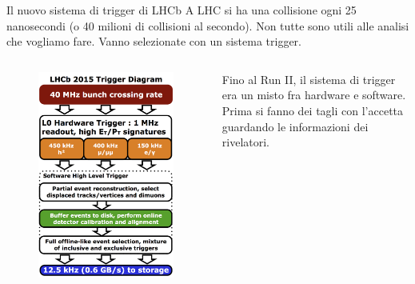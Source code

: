 \documentclass[
10pt,
aspectratio=169,
]{beamer}
\begin{document}
\begin{frame}{Il nuovo sistema di trigger di LHCb}
A LHC si ha una collisione ogni 25 nanosecondi (o 40 milioni di collisioni al secondo). Non tutte sono utili alle analisi che vogliamo fare. Vanno selezionate con un sistema trigger.
\begin{columns}
    \begin{figure}
        \centering
        \includegraphics[width=0.9\linewidth]{LHCb_Trigger_RunII_May2015.jpeg}
    \end{figure}
    \small
    Fino al Run II, il sistema di trigger era un misto fra hardware e software. Prima si fanno dei tagli con l'accetta guardando le informazioni dei rivelatori.
    
    \vspace{0.3cm}
    

\end{columns}
\end{frame}
\end{document}
